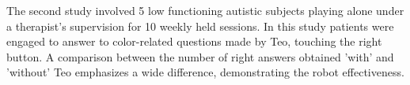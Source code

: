 The second study involved 5 low functioning autistic subjects playing alone under a therapist's supervision for 10 weekly held sessions. In this study patients were engaged to answer to color-related questions made by Teo, touching the right button. A comparison between the number of right answers obtained 'with' and 'without' Teo emphasizes a wide difference, demonstrating the robot effectiveness.
